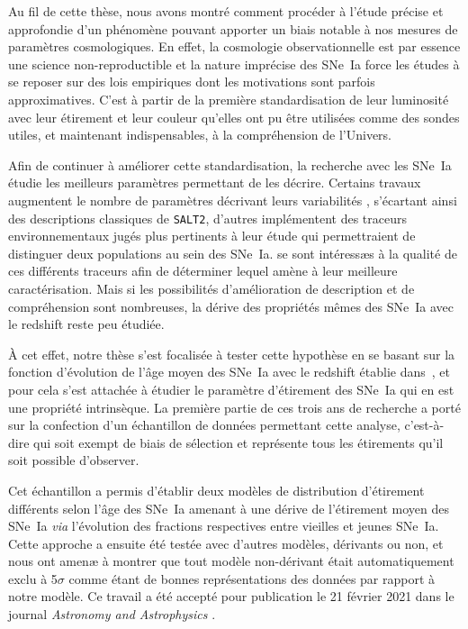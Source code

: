 \documentclass[../main/main.tex]{subfiles}
\begin{document}


Au fil de cette thèse, nous avons montré comment procéder à l'étude précise et
approfondie d'un phénomène pouvant apporter un biais notable à nos mesures de
paramètres cosmologiques. En effet, la cosmologie observationnelle est par
essence une science non-reproductible et la nature imprécise des SNe~Ia force
les études à se reposer sur des lois empiriques dont les motivations sont
parfois approximatives. C'est à partir de la première standardisation de leur
luminosité avec leur étirement et leur couleur qu'elles ont pu être utilisées
comme des sondes utiles, et maintenant indispensables, à la compréhension de
l'Univers.

Afin de continuer à améliorer cette standardisation, la recherche avec les
SNe~Ia étudie les meilleurs paramètres permettant de les décrire. Certains
travaux augmentent le nombre de paramètres décrivant leurs variabilités
\citep[c'est le cas de SUGAR, décrit dans][]{leget2020}, s'écartant ainsi des
descriptions classiques de \texttt{SALT2}, d'autres implémentent des traceurs
environnementaux jugés plus pertinents à leur étude \citep[par exemple, le LsSFR
dans][ou la masse de la galaxie hôte dans~\citet{childress2013}]{rigault2013} qui
permettraient de distinguer deux populations au sein des SNe~Ia.
\cite{briday2022} se sont intéressæs à la qualité de ces différents traceurs
afin de déterminer lequel amène à leur meilleure caractérisation. Mais si les
possibilités d'amélioration de description et de compréhension sont nombreuses,
la dérive des propriétés mêmes des SNe~Ia avec le redshift reste peu étudiée.

À cet effet, notre thèse s'est focalisée à tester cette hypothèse en se basant
sur la fonction d'évolution de l'âge moyen des SNe~Ia avec le redshift établie
dans~\cite{rigault2020}, et pour cela s'est attachée à étudier le paramètre
d'étirement des SNe~Ia qui en est une propriété intrinsèque. La première partie
de ces trois ans de recherche a porté sur la confection d'un échantillon de
données permettant cette analyse, c'est-à-dire qui soit exempt de biais de
sélection et représente tous les étirements qu'il soit possible d'observer.

Cet échantillon a permis d'établir deux modèles de distribution d'étirement
différents selon l'âge des SNe~Ia amenant à une dérive de l'étirement moyen des
SNe~Ia \textit{via} l'évolution des fractions respectives entre vieilles et
jeunes SNe~Ia. Cette approche a ensuite été testée avec d'autres modèles,
dérivants ou non, et nous ont amenæ à montrer que tout modèle non-dérivant était
automatiquement exclu à 5$\sigma$ comme étant de bonnes représentations des
données par rapport à notre modèle. Ce travail a été accepté pour publication le
21 février 2021 dans le journal \textit{Astronomy and Astrophysics}
\citep{nicolas2021}.
\end{document}
